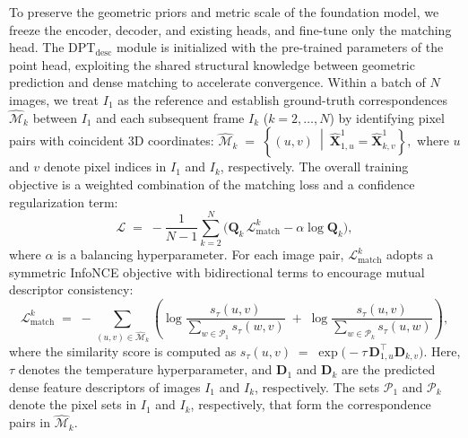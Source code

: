 To preserve the geometric priors and metric scale of the foundation model, we freeze the encoder, decoder, and existing heads, and fine-tune only the matching head. 
The $\mathrm{DPT}_{\text{desc}}$ module is initialized with the pre-trained parameters of the point head, exploiting the shared structural knowledge between geometric prediction and dense matching to accelerate convergence. Within a batch of $N$ images, we treat $I_1$ as the reference and establish ground-truth correspondences $\hat{\mathcal{M}}_k$ between $I_1$ and each subsequent frame $I_k$ ($k=2,\dots,N$) by identifying pixel pairs with coincident 3D coordinates:
$
\hat{\mathcal{M}}_k \;=\; \left\{ (u,v)\ \middle|\ \hat{\mathbf{X}}_{1,u}^{1} =\hat{\mathbf{X}}_{k,v}^{1}\right\},
$
where $u$ and $v$ denote pixel indices in $I_1$ and $I_k$, respectively. The overall training objective is a weighted combination of the matching loss and a confidence regularization term:
\begin{equation}
\mathcal{L}
\;=\;
-\frac{1}{N-1}\sum_{k=2}^{N}\Big( \mathbf{Q}_k\,\mathcal{L}^{k}_{\text{match}}-\alpha \log \mathbf{Q}_k \Big),
\end{equation}
where $\alpha$ is a balancing hyperparameter. For each image pair, $\mathcal{L}^{k}_{\text{match}}$ adopts a symmetric InfoNCE objective with bidirectional terms to encourage mutual descriptor consistency:
\begin{equation}
\mathcal{L}^{k}_{\text{match}}
\;=\;
-\sum_{(u,v)\in \hat{\mathcal{M}}_k}
\left(
\log \frac{s_{\tau}(u,v)}{\sum_{w \in \mathcal{P}_{1}} s_{\tau}(w,v)}
\;+\;
\log \frac{s_{\tau}(u,v)}{\sum_{w \in \mathcal{P}_{k}} s_{\tau}(u,w)}
\right),
\end{equation}
where the similarity score is computed as
$
s_{\tau}(u,v) \;=\; \exp\!\Big(-\tau\,\mathbf{D}_{1,u}^{\top}\mathbf{D}_{k,v}\Big).
$ Here, $\tau$ denotes the temperature hyperparameter, and $\mathbf{D}_1$ and $\mathbf{D}_k$ are the predicted dense feature descriptors of images $I_1$ and $I_k$, respectively. The sets $\mathcal{P}_1$ and $\mathcal{P}_k$ denote the pixel sets in $I_1$ and $I_k$, respectively, that form the correspondence pairs in $\hat{\mathcal{M}}_k$.

